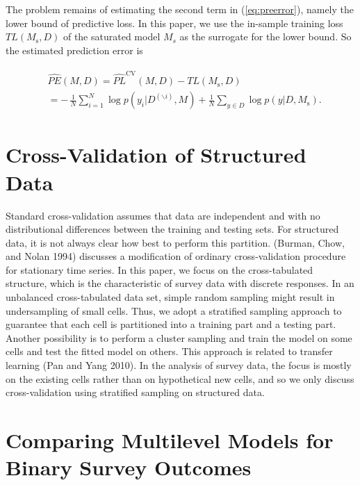 The problem remains of estimating the second term in
(\ref{eq:preerror}), namely the lower bound of predictive loss. In this
paper, we use the in-sample training loss \(TL(M_{\text{s}}, D)\) of the
saturated model \(M_s\) as the surrogate for the lower bound. So the
estimated prediction error is

\begin{align}
\begin{split}
  \label{eq:esti_preerror}
  &\widehat{PE}(M, D)=\widehat{PL}^{\text{CV}}(M,D)-TL(M_{\text{s}},D)\\
  &= -\,\frac{1}{N}\sum_{i=1}^N\log p(y_i|D^{(\backslash i)},
  M)+\frac{1}{N}\sum_{y\in D}\log p(y | D, M_{\text{s}}).
\end{split}
\end{align}

\section{Cross-Validation of Structured
Data}\label{cross-validation-of-structured-data}

Standard cross-validation assumes that data are independent and with no
distributional differences between the training and testing sets. For
structured data, it is not always clear how best to perform this
partition. (Burman, Chow, and Nolan 1994) discusses a modification of
ordinary cross-validation procedure for stationary time series. In this
paper, we focus on the cross-tabulated structure, which is the
characteristic of survey data with discrete responses. In an unbalanced
cross-tabulated data set, simple random sampling might result in
undersampling of small cells. Thus, we adopt a stratified sampling
approach to guarantee that each cell is partitioned into a training part
and a testing part. Another possibility is to perform a cluster sampling
and train the model on some cells and test the fitted model on others.
This approach is related to transfer learning (Pan and Yang 2010). In
the analysis of survey data, the focus is mostly on the existing cells
rather than on hypothetical new cells, and so we only discuss
cross-validation using stratified sampling on structured data.

\section{Comparing Multilevel Models for Binary Survey
Outcomes}\label{comparing-multilevel-models-for-binary-survey-outcomes}

